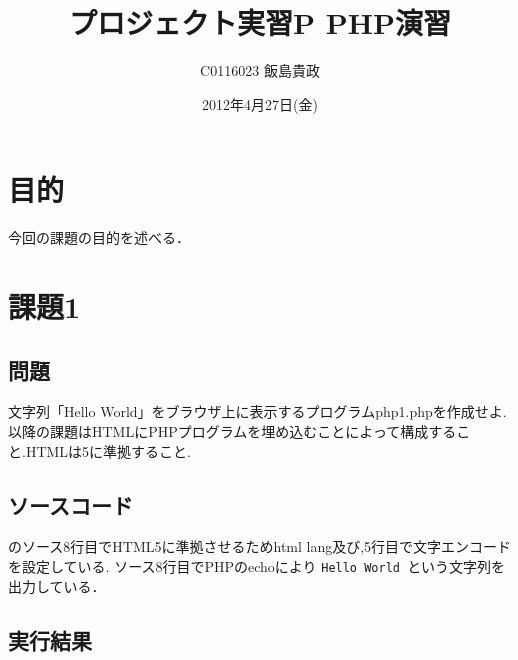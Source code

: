 \documentclass[a4j,10pt]{jsarticle}
\title{プロジェクト実習P PHP演習}
\author{C0116023 飯島貴政}
\date{2012年4月27日(金)}
\begin{document}
\maketitle


\section{目的}

今回の課題の目的を述べる．

\lstset{
    language = PHP,
    breaklines = true,
    breakindent = 10pt,
    basicstyle = \ttfamily\scriptsize,
    classoffset = 0,
    frame = TBrl,
    framesep = 5pt,
    numbers = left,
    stepnumber = 1,
    numberstyle = \tiny,
    tabsize = 4,
    captionpos = t
}
\section{課題1}

\subsection{問題}

文字列「Hello World」をブラウザ上に表示するプログラムphp1.phpを作成せよ.
以降の課題はHTMLにPHPプログラムを埋め込むことによって構成すること.HTMLは5に準拠すること.


\subsection{ソースコード}



のソース8行目でHTML5に準拠させるためhtml lang及び,5行目で文字エンコードを設定している.
ソース8行目でPHPのechoにより {\tt Hello World }という文字列を出力している．

\subsection{実行結果}
\end{document}
